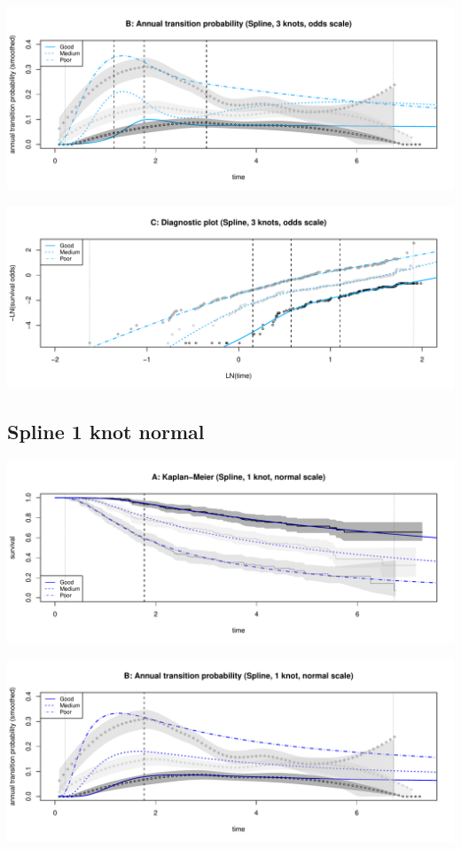 \documentclass[
]{article}
\begin{document}
\begin{flushleft}\includegraphics[height=0.25\textheight]{Images/spline_odds3-2} \end{flushleft}

\begin{flushleft}\includegraphics[height=0.25\textheight]{Images/spline_odds3-3} \end{flushleft}

\hypertarget{spline-1-knot-normal}{%
\subsection{Spline 1 knot normal}\label{spline-1-knot-normal}}

\begin{flushleft}\includegraphics[height=0.25\textheight]{Images/spline_norm1-1} \end{flushleft}

\begin{flushleft}\includegraphics[height=0.25\textheight]{Images/spline_norm1-2} \end{flushleft}
\end{document}
